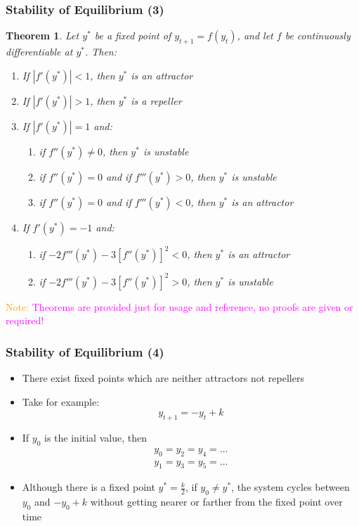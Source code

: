 \documentclass[10pt,usenames,dvipsnames]{beamer}
\theoremstyle{plain}
\newtheorem{thm}{Theorem}
\theoremstyle{definition}
\begin{document}
\begin{frame}[fragile]
\frametitle{Stability of Equilibrium (3)}

\begin{thm}
Let $y^{*}$ be a fixed point of $y_{t+1} = f(y_{t})$, and let $f$ be continuously differentiable at $y^{*}$. Then:
\begin{enumerate}
	\item If $|f'(y^{*})| < 1$, then $y^{*}$ is an attractor
	\item If $|f'(y^{*})| > 1$, then $y^{*}$ is a repeller
	\item If $|f'(y^{*})| = 1$ and:
	\begin{enumerate}
		\item if $f''(y^{*}) \neq 0$, then $y^{*}$ is unstable
		\item if $f''(y^{*}) = 0$ and if $f'''(y^{*}) > 0$, then $y^{*}$ is unstable
		\item if $f''(y^{*}) = 0$ and if $f'''(y^{*}) < 0$, then $y^{*}$ is an attractor
	\end{enumerate}
	\item If $f'(y^{*}) = -1$ and:
	\begin{enumerate}
		\item if $-2f'''(y^{*}) - 3[f''(y^{*})]^{2} < 0$, then $y^{*}$ is an attractor
		\item if $-2f'''(y^{*}) - 3[f''(y^{*})]^{2} > 0$, then $y^{*}$ is unstable
	\end{enumerate}
\end{enumerate}
\end{thm}

\textcolor{orange}{Note:} \textcolor{magenta}{Theorems are provided just for usage and reference, no proofs are given or required!}

\end{frame}

\begin{frame}[fragile]
\frametitle{Stability of Equilibrium (4)}
\begin{itemize}
	\item There exist fixed points which are neither attractors not repellers
	\item Take for example:
	\[
		y_{t+1} = -y_{t} + k
	\]
	\item If $y_{0}$ is the initial value, then
	\[
		\begin{array}{lcl}
			y_{0} = y_{2} = y_{4} = \ldots\\
			y_{1} = y_{3} = y_{5} = \ldots
		\end{array}
	\]
	\item Although there is a fixed point $y^{*} = \displaystyle \frac{k}{2}$, if $y_{0} \neq y^{*}$, the system cycles between $y_{0}$ and $-y_{0} + k$ without getting nearer or farther from the fixed point over time
\end{itemize}
\end{frame}
\end{document}
